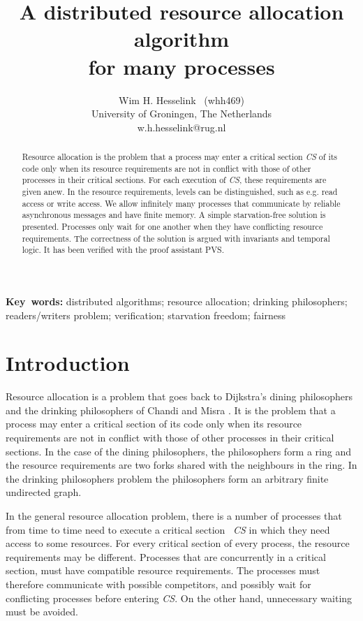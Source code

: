 \documentclass[10pt]{article} \usepackage[english]{babel}
\newcounter {tabnr}
\def\S #1/{\mbox {\textsl{#1}}}
\def\B #1/{\mbox {\textbf{#1}}}
\def\bbreak {\bigbreak\noindent}
\begin{document}
\title {A distributed resource allocation algorithm\\
    for many processes}
\author {Wim H. Hesselink \ (whh469)\\
  University of Groningen, The Netherlands\\
  w.h.hesselink@rug.nl
}
\maketitle

\setcounter{tabnr}{-1}

\begin{abstract}
\noindent
Resource allocation is the problem that a process may enter a critical
section \S CS/ of its code only when its resource requirements are not
in conflict with those of other processes in their critical sections.
For each execution of \S CS/, these requirements are given anew. In
the resource requirements, levels can be distinguished, such as
e.g. read access or write access.  We allow infinitely many processes
that communicate by reliable asynchronous messages and have finite
memory.  A simple starvation-free solution is presented.  Processes
only wait for one another when they have conflicting resource
requirements.  The correctness of the solution is argued with
invariants and temporal logic. It has been verified with the proof
assistant PVS.
\end{abstract}

\bbreak \B Key words:/ distributed algorithms; resource allocation;
drinking philosophers; readers/writers problem; verification;
starvation freedom; fairness

\section {Introduction}

Resource allocation is a problem that goes back to Dijkstra's dining
philosophers \cite{Dij71} and the drinking philosophers of Chandi and
Misra \cite{ChM84}. It is the problem that a process may enter a
critical section of its code only when its resource requirements are
not in conflict with those of other processes in their critical
sections. In the case of the dining philosophers, the philosophers
form a ring and the resource requirements are two forks shared with
the neighbours in the ring.  In the drinking philosophers problem the
philosophers form an arbitrary finite undirected graph.

In the general resource allocation problem, there is a number of
processes that from time to time need to execute a critical section \S
CS/ in which they need access to some resources.  For every critical
section of every process, the resource requirements may be different.
Processes that are concurrently in a critical section, must have
compatible resource requirements.  The processes must therefore
communicate with possible competitors, and possibly wait for
conflicting processes before entering \S CS/. On the other hand,
unnecessary waiting must be avoided.
\end{document}
